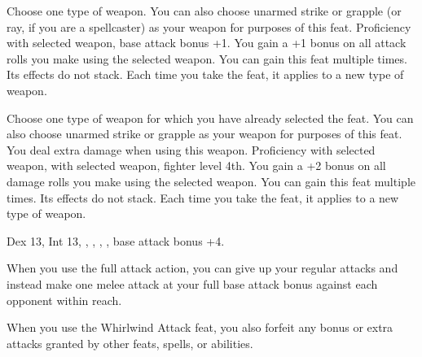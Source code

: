 {Choose one type of weapon. You can also choose unarmed strike or grapple (or ray, if you are a spellcaster) as your weapon for purposes of this feat.}
{Proficiency with selected weapon, base attack bonus +1.}
{You gain a +1 bonus on all attack rolls you make using the selected weapon.}{}
{You can gain this feat multiple times. Its effects do not stack. Each time you take the feat, it applies to a new type of weapon.}

{Choose one type of weapon for which you have already selected the  feat. You can also choose unarmed strike or grapple as your weapon for purposes of this feat. You deal extra damage when using this weapon.}
{Proficiency with selected weapon,  with selected weapon, fighter level 4th.}
{You gain a +2 bonus on all damage rolls you make using the selected weapon.}{}
{You can gain this feat multiple times. Its effects do not stack. Each time you take the feat, it applies to a new type of weapon.}

{Dex 13, Int 13, , , , , base attack bonus +4.}
{When you use the full attack action, you can give up your regular attacks and instead make one melee attack at your full base attack bonus against each opponent within reach.

When you use the Whirlwind Attack feat, you also forfeit any bonus or extra attacks granted by other feats, spells, or abilities.}
